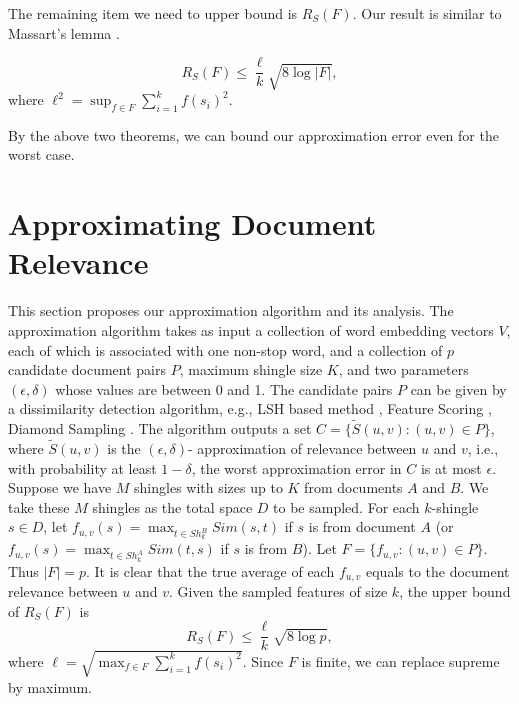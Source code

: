 \documentclass{article}
\begin{document}
The remaining item we need to upper bound is $R_S(F)$. Our result is similar to Massart's lemma \cite{AGO14}.

\begin{theorem}
\label{thm2}
$$R_S(F) \leq \frac{\ell}{k}\sqrt{8\log |F|},$$
where $\ell^2 = \sup_{f\in F}\sum_{i=1}^k f(s_i)^2$.
\end{theorem}

By the above two theorems, we can bound our approximation error even for the worst case.


\section{Approximating Document Relevance}
\label{sec:acs}
This section proposes our approximation algorithm and its analysis.
{\color{black}
The approximation algorithm takes as input a collection of word embedding vectors $V$, each of which is associated with one non-stop word, and a collection of $p$ candidate document pairs $P$, maximum shingle size $K$, and two parameters $(\epsilon, \delta)$ whose values are between 0 and 1. The candidate pairs $P$ can be given by a dissimilarity detection algorithm, e.g., LSH based method \cite{LRU14}, Feature Scoring \cite{CL99}, Diamond Sampling \cite{BKP15}. The algorithm outputs a set $C = \{\tilde{S}(u,v): (u,v)\in P\}$, where $\tilde{S}(u,v)$ is the $(\epsilon, \delta)$- approximation of relevance between $u$ and $v$, i.e., with probability at least $1-\delta$, the worst approximation error in $C$ is at most $\epsilon$. Suppose we have $M$ shingles with sizes up to $K$ from documents $A$ and $B$. We take these $M$ shingles as the total space $D$ to be sampled. For each $k$-shingle $s\in D$, let $f_{u,v}(s) = \max_{t\in Sh_k^B}Sim(s, t)$ if $s$ is from document $A$ (or $f_{u,v}(s) = \max_{t\in Sh_k^A}Sim(t, s)$ if $s$ is from $B$). Let $F = \{f_{u,v}: (u,v)\in P\}$. Thus $|F| = p$. It is clear that the true average of each $f_{u,v}$ equals to the document relevance between $u$ and $v$. Given the sampled features of size $k$, the upper bound of $R_S(F)$ is 
$$R_S(F) \leq \frac{\ell}{k}\sqrt{8\log p},$$
where $\ell = \sqrt{\max_{f\in F} \sum_{i=1}^k f(s_i)^2}$. Since $F$ is finite, we can replace supreme by maximum. 
}
\end{document}
